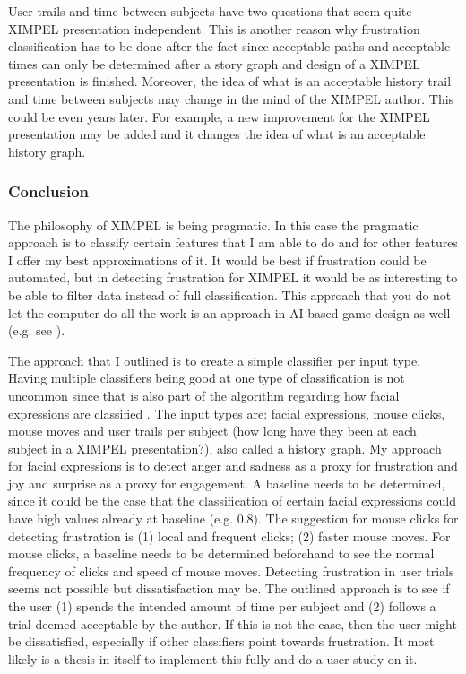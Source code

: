 User trails and time between subjects have two questions that seem quite XIMPEL presentation independent. This is another reason why frustration classification has to be done after the fact since acceptable paths and acceptable times can only be determined after a story graph and design of a XIMPEL presentation is finished. Moreover, the idea of what is an acceptable history trail and time between subjects may change in the mind of the XIMPEL author. This could be even years later. For example, a new improvement for the XIMPEL presentation may be added and it changes the idea of what is an acceptable history graph.

\subsubsection{Conclusion}
The philosophy of XIMPEL is being pragmatic. In this case the pragmatic approach is to classify certain features that I am able to do and for other features I offer my best approximations of it. It would be best if frustration could be automated, but in detecting frustration for XIMPEL it would be as interesting to be able to filter data instead of full classification. This approach that you do not let the computer do all the work is an approach in AI-based game-design as well (e.g. see \cite{karavolos2015}). 

The approach that I outlined is to create a simple classifier per input type. Having multiple classifiers being good at one type of classification is not uncommon since that is also part of the algorithm regarding how facial expressions are classified \cite{auduno2014}. The input types are: facial expressions, mouse clicks, mouse moves and user trails per subject (how long have they been at each subject in a XIMPEL presentation?), also called a history graph. My approach for facial expressions is to detect anger and sadness as a proxy for frustration and joy and surprise as a proxy for engagement. A baseline needs to be determined, since it could be the case that the classification of certain facial expressions could have high values already at baseline (e.g. 0.8). The suggestion for mouse clicks for detecting frustration is (1) local and frequent clicks; (2) faster mouse moves. For mouse clicks, a baseline needs to be determined beforehand to see the normal frequency of clicks and speed of mouse moves. Detecting frustration in user trials seems not possible but dissatisfaction may be. The outlined approach is to see if the user (1) spends the intended amount of time per subject and (2) follows a trial deemed acceptable by the author. If this is not the case, then the user might be dissatisfied, especially if other classifiers point towards frustration. It most likely is a thesis in itself to implement this fully and do a user study on it.

